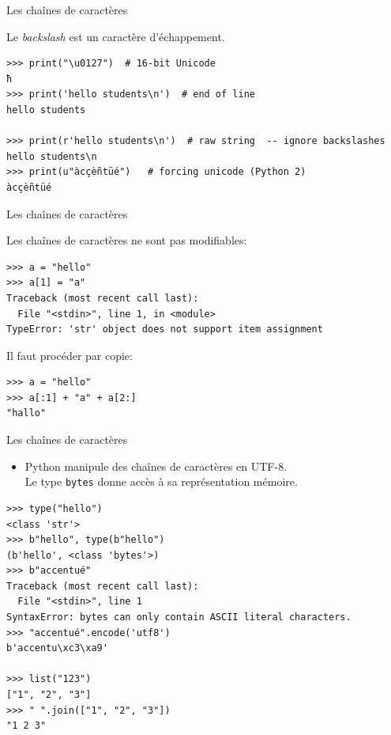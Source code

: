 \documentclass[dvipsnames]{beamer}
\begin{document}
\begin{frame}
    [fragile]{Les chaînes de caractères}

    Le \textit{backslash} est un caractère d'échappement.
    \begin{verbatim}
>>> print("\u0127")  # 16-bit Unicode
ħ
>>> print('hello students\n')  # end of line
hello students

>>> print(r'hello students\n')  # raw string  -- ignore backslashes
hello students\n
>>> print(u"àcçèñtüé")   # forcing unicode (Python 2)
àcçèñtüé
\end{verbatim}
\end{frame}

\begin{frame}
    [fragile]{Les chaînes de caractères}

    Les chaînes de caractères ne sont pas modifiables:
    \begin{verbatim}
>>> a = "hello"
>>> a[1] = "a"
Traceback (most recent call last):
  File "<stdin>", line 1, in <module>
TypeError: 'str' object does not support item assignment
\end{verbatim}

    Il faut procéder par copie:
    \begin{verbatim}
>>> a = "hello"
>>> a[:1] + "a" + a[2:]
"hallo"
\end{verbatim}
\end{frame}


\begin{frame}
    [fragile]{Les chaînes de caractères}

    \begin{itemize}
        \item Python manipule des chaînes de caractères en UTF-8.\\Le type
              \texttt{bytes} donne accès à sa représentation mémoire.
    \end{itemize}

    \begin{verbatim}
>>> type("hello")
<class 'str'>
>>> b"hello", type(b"hello")
(b'hello', <class 'bytes'>)
>>> b"accentué"
Traceback (most recent call last):
  File "<stdin>", line 1
SyntaxError: bytes can only contain ASCII literal characters.
>>> "accentué".encode('utf8')
b'accentu\xc3\xa9'

>>> list("123")
["1", "2", "3"]
>>> " ".join(["1", "2", "3"])
"1 2 3"
\end{verbatim}

\end{frame}
\end{document}
